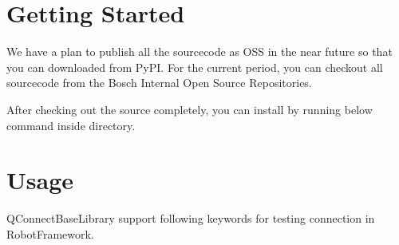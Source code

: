 \documentclass[letterpaper,10pt,english]{sphinxmanual}
\begin{document}
\chapter{Getting Started}
\label{\detokenize{index:getting-started}}
\sphinxAtStartPar
We have a plan to publish all the sourcecode as OSS in the near future
so that you can downloaded from PyPI. For the current period, you can
checkout all
sourcecode from the Bosch Internal Open Source Repositories.

\sphinxAtStartPar
After checking out the source completely, you can install by running
below command inside  directory.

\begin{sphinxVerbatim}[commandchars=\\\{\}]
  
\end{sphinxVerbatim}


\chapter{Usage}
\label{\detokenize{index:usage}}
\sphinxAtStartPar
QConnectBaseLibrary support following keywords for testing connection in RobotFramework.
\end{document}
